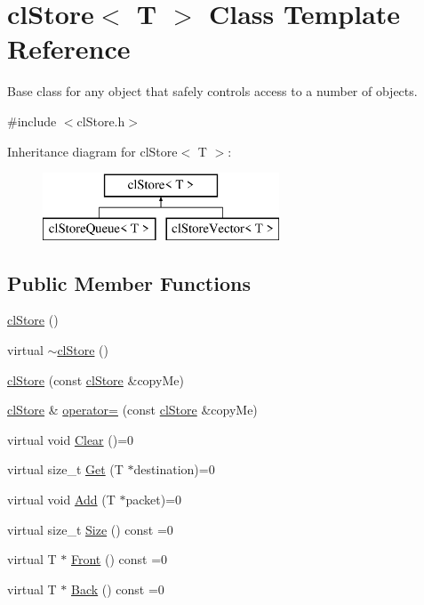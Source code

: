 \hypertarget{classcl_store}{
\section{clStore$<$ T $>$ Class Template Reference}
\label{classcl_store}
}


Base class for any object that safely controls access to a number of objects.  




{\ttfamily \#include $<$clStore.h$>$}

Inheritance diagram for clStore$<$ T $>$:\begin{figure}[H]
\begin{center}
\leavevmode
\includegraphics[height=2.000000cm]{classcl_store}
\end{center}
\end{figure}
\subsection*{Public Member Functions}
\begin{DoxyCompactItemize}
\item 
\hyperlink{classcl_store_aec49a01154d426a6dc8f56b745190ef0}{clStore} ()
\item 
virtual \hyperlink{classcl_store_a7f73ac79b7295302d66097ff655b4647}{$\sim$clStore} ()
\item 
\hyperlink{classcl_store_ad90a411c1d9b7ec0a9f3ccfb18e6e5ba}{clStore} (const \hyperlink{classcl_store}{clStore} \&copyMe)
\item 
\hyperlink{classcl_store}{clStore} \& \hyperlink{classcl_store_a2287bd3dc920637c390f581cb044865e}{operator=} (const \hyperlink{classcl_store}{clStore} \&copyMe)
\item 
virtual void \hyperlink{classcl_store_a62772dea2e8b0ed2d913baacf8ee3bb4}{Clear} ()=0
\item 
virtual size\_\-t \hyperlink{classcl_store_a6d95a4fd9236e1b005efdfcb27391006}{Get} (T $\ast$destination)=0
\item 
virtual void \hyperlink{classcl_store_a1bd48dc5a9dc8729cdd18b61eef17daa}{Add} (T $\ast$packet)=0
\item 
virtual size\_\-t \hyperlink{classcl_store_a8ea87e866f8e8c6a3b2bcdc0423ae469}{Size} () const =0
\item 
virtual T $\ast$ \hyperlink{classcl_store_a31a2f4628a2ed892ac193bec64df1ca0}{Front} () const =0
\item 
virtual T $\ast$ \hyperlink{classcl_store_a3a4c1bed69cc705414cf42eeb9e3601f}{Back} () const =0
\end{DoxyCompactItemize}
